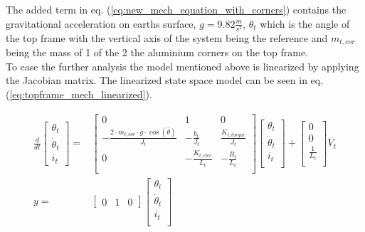 \documentclass[../../main]{subfiles}
\begin{document}
The added term in eq. (\ref{eq:new_mech_equation_with_corners}) contains the gravitational acceleration on earths surface, $g = 9.82 \si{\frac{m}{s^2}}$, $\theta_t$ which is the angle of the top frame with the vertical axis of the system being the reference and $m_{t,cor}$ being the mass of 1 of the 2 the aluminium corners on the top frame.\\
To ease the further analysis the model mentioned above is linearized by applying the Jacobian matrix. The linearized state space model can be seen in eq. (\ref{eq:topframe_mech_linearized}).

\begin{equation}
      \label{eq:topframe_mech_linearized}
      \begin{split}
      \frac{d}{dt}
    \begin{bmatrix}
        \theta_t \\
        \dot \theta_t \\
        i_t
    \end{bmatrix}
    =&
    \begin{bmatrix}
        0 & 1               & 0             \\
        -\frac{2\cdot m_{t,cor} \cdot g \cdot \cos(\bar \theta)}{J_t} & -\frac{b_t}{J_t}    & \frac{K_{t,torque}}{J_t} \\
        0 & -\frac{K_{t,elec}}{L_t}  & -\frac{R_t}{L_t}  \\
    \end{bmatrix}
    \begin{bmatrix}
        \theta_t \\
        \dot \theta_t \\
        i_t \\
    \end{bmatrix}
    +
    \begin{bmatrix}
        0 \\
        0 \\
        \frac{1}{L_t} \\
    \end{bmatrix}
    V_t
\\
      y =&
    \begin{bmatrix}
        0 & 1 & 0
    \end{bmatrix}
    \begin{bmatrix}
        \theta_t \\
        \dot \theta_t\\
        i_t\\
    \end{bmatrix}
    \end{split}
\end{equation}
\end{document}
